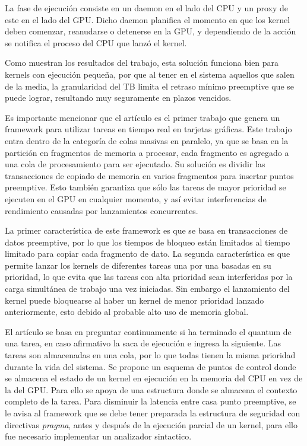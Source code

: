\vspace{0.3cm}

La fase de ejecución consiste en un daemon en el lado del CPU y un proxy de este en el lado del GPU. Dicho daemon planifica el momento en que los kernel deben comenzar, reanudarse o detenerse en la GPU, y dependiendo de la acción se notifica el proceso del CPU que lanzó el kernel.

\vspace{0.3cm}

Como muestran los resultados del trabajo, esta solución funciona bien para kernels con ejecución pequeña, por que al tener en el sistema aquellos que salen de la media, la granularidad del TB limita el retraso mínimo preemptive que se puede lograr, resultando muy seguramente en plazos vencidos.
 
 
 Es importante mencionar que el artículo \cite{RGEM} es el primer trabajo que genera un framework para utilizar tareas en tiempo real en tarjetas gráficas. Este trabajo entra dentro de la categoría de colas masivas en paralelo, ya que se basa en la partición en fragmentos de memoria a procesar, cada fragmento es agregado a una cola de procesamiento para ser ejecutado. Su solución es dividir las transacciones de copiado de memoria en varios fragmentos para insertar puntos preemptive. Esto también garantiza que sólo las tareas de mayor prioridad se ejecuten en el GPU en cualquier momento, y así evitar interferencias de rendimiento causadas por lanzamientos concurrentes.
	
	\vspace{0.3cm}
	
	La primer característica de este framework es que se basa en transacciones de datos preemptive, por lo que los tiempos de bloqueo están limitados al tiempo limitado para copiar cada fragmento de dato. La segunda característica es que permite lanzar los kernels de diferentes tareas una por una basadas en su prioridad, lo que evita que las tareas con alta prioridad sean interferidas por la carga simultánea de trabajo una vez iniciadas. Sin embargo el lanzamiento del kernel puede bloquearse al haber un kernel de menor prioridad lanzado anteriormente, esto debido al probable alto uso de memoria global.
	

El artículo \cite{PreeK} se basa en preguntar continuamente si ha terminado el quantum de una tarea, en caso afirmativo la saca de ejecución e ingresa la siguiente. Las tareas son almacenadas en una cola, por lo que todas tienen la misma prioridad durante la vida del sistema. Se propone un esquema de puntos de control donde se almacena el estado de un kernel en ejecución en la memoria del CPU en vez de la del GPU. Para ello se apoya de una estructura donde se almacena el contexto completo de la tarea. Para disminuir la latencia entre casa punto preemptive, se le avisa al framework que se debe tener preparada la estructura de seguridad con directivas \textit{pragma}, antes y después de la ejecución parcial de un kernel, para ello fue necesario implementar un analizador sintactico.

